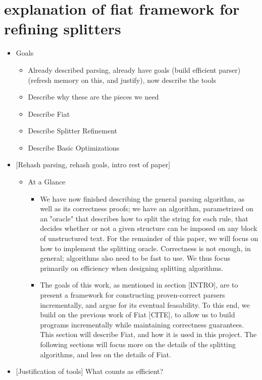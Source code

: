 \section{explanation of fiat framework for refining splitters}
  \begin{itemize} \item  Goals
    \begin{itemize} \item  Already described parsing, already have goals (build efficient parser) (refresh memory on this, and justify), now describe the tools 
    \item  Describe why these are the pieces we need 
    \item  Describe Fiat 
    \item  Describe Splitter Refinement 
    \item  Describe Basic Optimizations \end{itemize}
  \item{} {}[Rehash parsing, rehash goals, intro rest of paper]
    \begin{itemize} \item  At a Glance 
      \begin{itemize} \item  We have now finished describing the general parsing algorithm, as well as its correctness proofs; we have an algorithm, parametrized on an "oracle" that describes how to split the string for each rule, that decides whether or not a given structure can be imposed on any block of unstructured text.  For the remainder of this paper, we will focus on how to implement the splitting oracle.  Correctness is not enough, in general; algorithms also need to be fast to use.  We thus focus primarily on efficiency when designing splitting algorithms. 
      \item  The goals of this work, as mentioned in section {}[INTRO], are to present a framework for constructing proven-correct parsers incrementally, and argue for its eventual feasability.  To this end, we build on the previous work of Fiat {}[CITE], to allow us to build programs incrementally while maintaining correctness guarantees.  This section will describe Fiat, and how it is used in this project.  The following sections will focus more on the details of the splitting algorithms, and less on the details of Fiat. \end{itemize} \end{itemize}
  \item  {}[Justification of tools] What counts as efficient?

\end{itemize}

